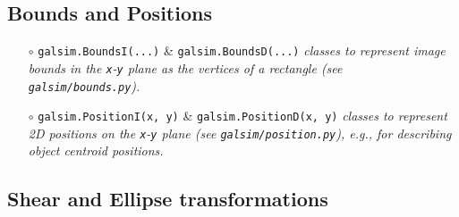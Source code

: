 \documentclass[preprint,11pt]{aastex}
\begin{document}
\subsection{Bounds and Positions}\label{sect:bounds}

\begin{itemize}

\item[$\circ$] \texttt{galsim.BoundsI(...)} \&
  \texttt{galsim.BoundsD(...)} \newline \emph{classes to represent
    image bounds in the \texttt{x}-\texttt{y} plane as the vertices of
    a rectangle (see \texttt{galsim/bounds.py}).}

\item[$\circ$] \texttt{galsim.PositionI(x, y)} \&
  \texttt{galsim.PositionD(x, y)} \newline \emph{classes to represent
    2D positions on the \texttt{x}-\texttt{y} plane (see
    \texttt{galsim/position.py}), e.g., for describing object centroid
    positions.}

\end{itemize}

\subsection{Shear and Ellipse transformations}\label{sect:shears}
\end{document}
